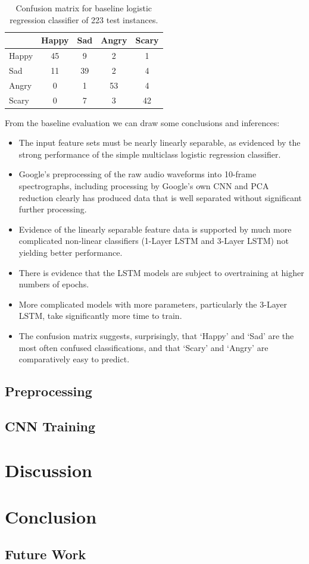 \documentclass{article}
\begin{document}
\begin{table}[] 
\caption{Confusion matrix for baseline logistic regression classifier of 223 test instances.}
\label{tbl:baseline_conf}
\centering
\begin{tabular}{lcccc} 
\toprule
\hline
 & Happy & Sad & Angry & Scary \\ 
\midrule
Happy & 45 &  9 & 2 & 1 \\
Sad   &  11 & 39 & 2 & 4 \\
Angry &  0 &  1 & 53 & 4 \\
Scary &  0 &  7 & 3 &  42 \\
\bottomrule
\end{tabular}
\end{table}

From the baseline evaluation we can draw some conclusions and inferences:
\begin{itemize}
\item The input feature sets must be nearly linearly separable, as evidenced by the strong performance of the simple multiclass logistic regression classifier.
\item Google’s preprocessing of the raw audio waveforms into 10-frame spectrographs, including processing by Google’s own CNN and PCA reduction clearly has produced data that is well separated without significant further processing.
\item Evidence of the linearly separable feature data is supported by much more complicated non-linear classifiers (1-Layer LSTM and 3-Layer LSTM) not yielding better performance.
\item There is evidence that the LSTM models are subject to overtraining at higher numbers of epochs.
\item More complicated models with more parameters, particularly the 3-Layer LSTM, take significantly more time to train.
\item The confusion matrix suggests, surprisingly, that ‘Happy’ and ‘Sad’ are the most often confused classifications, and that ‘Scary’ and ‘Angry’ are comparatively easy to predict.
\end{itemize}


\subsection{Preprocessing}

\subsection{CNN Training}

\section{Discussion}

\section{Conclusion}

\subsection{Future Work}
  
 

\end{document}

